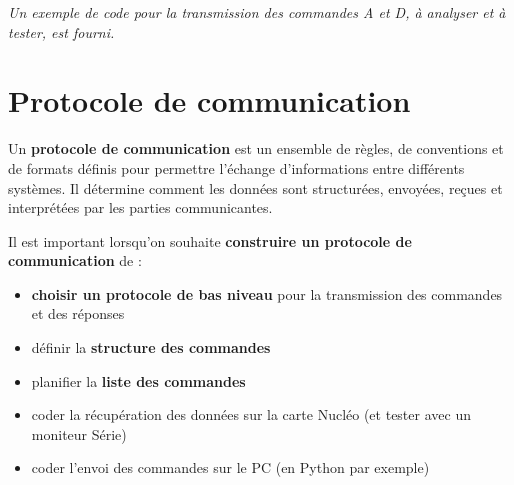 \documentclass[a4paper,11pt,titlepage]{article} %
\begin{document}
\begin{center}
\end{center}

\textit{Un exemple de code pour la transmission des commandes A et D, à analyser et à tester, est fourni.}

\section{Protocole de communication}

Un \textbf{protocole de communication} est un ensemble de règles, de conventions et de formats définis pour permettre l'échange d'informations entre différents systèmes. Il détermine comment les données sont structurées, envoyées, reçues et interprétées par les parties communicantes.

\medskip

Il est important lorsqu'on souhaite \textbf{construire un protocole de communication} de :

\begin{itemize}
	\item \textbf{choisir un protocole de bas niveau} pour la transmission des commandes et des réponses
	\item définir la \textbf{structure des commandes}
	\item planifier la \textbf{liste des commandes}
	\item coder la récupération des données sur la carte Nucléo (et tester avec un moniteur Série)
	\item coder l'envoi des commandes sur le PC (en Python par exemple)
\end{itemize}
\end{document}
